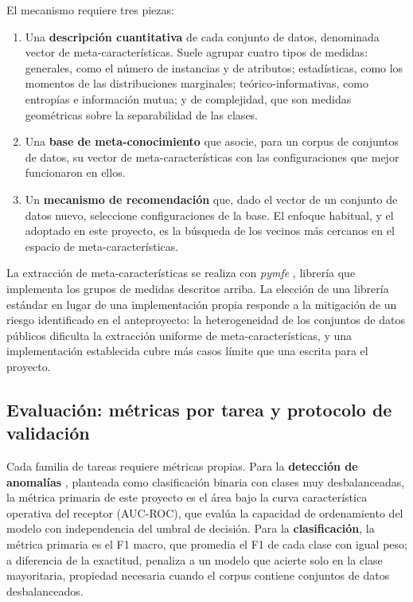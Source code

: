 \documentclass[12pt,letterpaper,oneside]{article}
\begin{document}
El mecanismo requiere tres piezas:

\begin{enumerate}
  \item Una \textbf{descripción cuantitativa} de cada conjunto de datos, denominada vector
        de meta-características. Suele agrupar cuatro tipos de medidas: generales, como el
        número de instancias y de atributos; estadísticas, como los momentos de las
        distribuciones marginales; teórico-informativas, como entropías e información
        mutua; y de complejidad, que son medidas geométricas sobre la separabilidad de las
        clases.
  \item Una \textbf{base de meta-conocimiento} que asocie, para un corpus de conjuntos de
        datos, su vector de meta-características con las configuraciones que mejor
        funcionaron en ellos.
  \item Un \textbf{mecanismo de recomendación} que, dado el vector de un conjunto de datos
        nuevo, seleccione configuraciones de la base. El enfoque habitual, y el adoptado
        en este proyecto, es la búsqueda de los vecinos más cercanos en el espacio de
        meta-características.
\end{enumerate}

La extracción de meta-características se realiza con \textit{pymfe}
\cite{pymfe-docs}, librería que implementa los grupos de medidas descritos arriba. La
elección de una librería estándar en lugar de una implementación propia responde a la
mitigación de un riesgo identificado en el anteproyecto: la heterogeneidad de los
conjuntos de datos públicos dificulta la extracción uniforme de meta-características, y
una implementación establecida cubre más casos límite que una escrita para el proyecto.

\subsection{Evaluación: métricas por tarea y protocolo de validación}

Cada familia de tareas requiere métricas propias. Para la \textbf{detección de anomalías}
\cite{chandola2009anomaly}, planteada como clasificación binaria con clases muy
desbalanceadas, la métrica primaria de este proyecto es el área bajo la curva
característica operativa del receptor (AUC-ROC), que evalúa la capacidad de ordenamiento
del modelo con independencia del umbral de decisión. Para la \textbf{clasificación}, la
métrica primaria es el F1 macro, que promedia el F1 de cada clase con igual peso; a
diferencia de la exactitud, penaliza a un modelo que acierte solo en la clase
mayoritaria, propiedad necesaria cuando el corpus contiene conjuntos de datos
desbalanceados.
\end{document}
